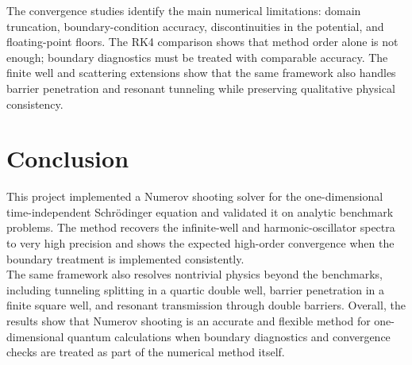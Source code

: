 \documentclass[11pt]{article}
\begin{document}
\begin{refsection}
        The convergence studies identify the main numerical limitations: domain truncation, boundary-condition accuracy, discontinuities in the potential, and floating-point floors. The RK4 comparison shows that method order alone is not enough; boundary diagnostics must be treated with comparable accuracy. The finite well and scattering extensions show that the same framework also handles barrier penetration and resonant tunneling while preserving qualitative physical consistency.

    \section{Conclusion}
        This project implemented a Numerov shooting solver for the one-dimensional time-independent Schr\"odinger equation and validated it on analytic benchmark problems. The method recovers the infinite-well and harmonic-oscillator spectra to very high precision and shows the expected high-order convergence when the boundary treatment is implemented consistently. \\

        The same framework also resolves nontrivial physics beyond the benchmarks, including tunneling splitting in a quartic double well, barrier penetration in a finite square well, and resonant transmission through double barriers. Overall, the results show that Numerov shooting is an accurate and flexible method for one-dimensional quantum calculations when boundary diagnostics and convergence checks are treated as part of the numerical method itself.

    \printbibliography[heading=bibintoc,title={References}]
    \end{refsection}
\end{document}
